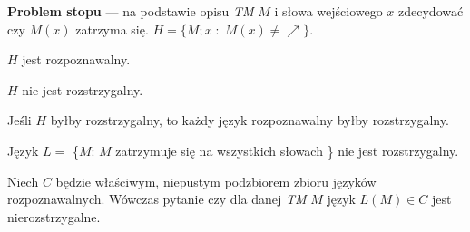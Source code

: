 \begin{definicja}
    \textbf{Problem stopu} --- na podstawie opisu \textit{TM} $M$ i słowa wejściowego $x$ 
    zdecydować czy $M(x)$ zatrzyma się. $H = \{M;x \;:\; M(x) \neq \nearrow\}$.
\end{definicja}
\begin{lemat}
    $H$ jest rozpoznawalny.
\end{lemat}
\begin{twierdzenie}
    $H$ nie jest rozstrzygalny.
\end{twierdzenie}
\begin{lemat}
    Jeśli $H$ byłby rozstrzygalny, to każdy język rozpoznawalny byłby rozstrzygalny.
\end{lemat}
\begin{lemat}
    Język $L =$ \{$M$: $M$ zatrzymuje się na wszystkich słowach \} nie jest rozstrzygalny.
\end{lemat}
\begin{twierdzenie}
    Niech $C$ będzie właściwym, niepustym podzbiorem zbioru języków rozpoznawalnych.
    Wówczas pytanie czy dla danej \textit{TM} $M$ język $L(M) \in C$ jest nierozstrzygalne.
\end{twierdzenie}